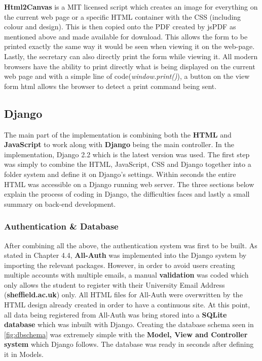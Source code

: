 \documentclass[../main.tex]{subfiles}
\begin{document}
\textbf{Html2Canvas}\cite{htmlcanvas} is a MIT licensed script which creates an image for everything on the current web page or a specific HTML container with the CSS (including colour and design). This is then copied onto the PDF created by jsPDF as mentioned above and made available for download. This allows the form to be printed exactly the same way it would be seen when viewing it on the web-page. \\[4mm]

Lastly, the secretary can also directly print the form while viewing it. All modern browsers have the ability to print directly what is being displayed on the current web page and with a simple line of code(\textit{window.print()}), a button on the view form html allows the browser to detect a print command being sent. 



\subsection{Django}
The main part of the implementation is combining both the \textbf{HTML} and \textbf{JavaScript} to work along with \textbf{Django} being the main controller. In the implementation, Django 2.2\cite{djangoLatest} which is the latest version was used. The first step was simply to combine the HTML, JavaScript, CSS and Django together into a folder system and define it on Django's settings. Within seconds the entire HTML was accessible on a Django running web server. The three sections below explain the process of coding in Django, the difficulties faces and lastly a small summary on back-end development. 

\subsubsection{Authentication \& Database}
After combining all the above, the authentication system was first to be built. As stated in Chapter 4.4, \textbf{All-Auth}\cite{allauth} was implemented into the Django system by importing the relevant packages. However, in order to avoid users creating multiple accounts with multiple emails, a manual \textbf{validation} was coded which only allows the student to register with their University Email Address (\textbf{sheffield.ac.uk}) only. All HTML files for All-Auth were overwritten by the HTML design already created in order to have a continuous site. At this point, all data being registered from All-Auth was bring stored into a \textbf{SQLite database} which was inbuilt with Django. Creating the database schema seen in \ref{fig:dbschema} was extremely simple with the \textbf{Model, View and Controller system} which Django follows. The database was ready in seconds after defining it in Models. \\[4mm]
\end{document}
